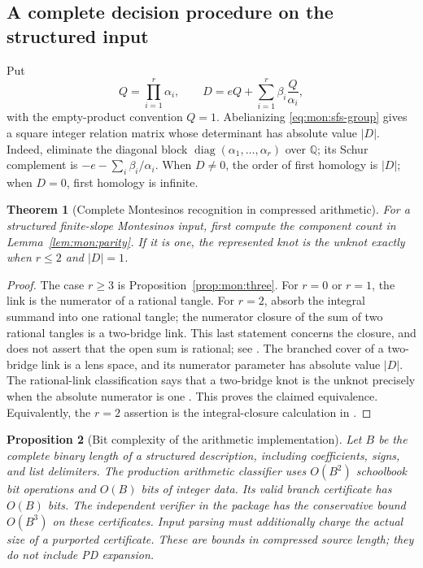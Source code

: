 \documentclass[11pt,a4paper]{article}
\newtheorem{theorem}{Theorem}[section]
\newtheorem{proposition}[theorem]{Proposition}
\theoremstyle{definition}
\theoremstyle{remark}
\numberwithin{equation}{section}
\begin{document}
\subsection{A complete decision procedure on the structured input}

Put
\begin{equation}\label{eq:mon:delta}
 Q=\prod_{i=1}^r\alpha_i,\qquad
 D=eQ+\sum_{i=1}^r\beta_i\frac{Q}{\alpha_i},
\end{equation}
with the empty-product convention $Q=1$.  Abelianizing
\eqref{eq:mon:sfs-group} gives a square integer relation matrix whose
determinant has absolute value $|D|$.  Indeed, eliminate the diagonal block
$\operatorname{diag}(\alpha_1,\ldots,\alpha_r)$ over $\mathbb Q$; its Schur
complement is $-e-\sum_i\beta_i/\alpha_i$.  When $D\ne0$, the order of first
homology is $|D|$; when $D=0$, first homology is infinite.

\begin{theorem}[Complete Montesinos recognition in compressed arithmetic]
\label{thm:mon:complete}
For a structured finite-slope Montesinos input, first compute the component
count in Lemma~\ref{lem:mon:parity}.  If it is one, the represented knot is
the unknot exactly when $r\le2$ and $|D|=1$.
\end{theorem}

\begin{proof}
The case $r\ge3$ is Proposition~\ref{prop:mon:three}.
For $r=0$ or $r=1$, the link is the numerator of a rational tangle.
For $r=2$, absorb the integral summand into one rational tangle; the numerator
closure of the sum of two rational tangles is a two-bridge link.  This last
statement concerns the closure, and does not assert that the open sum is
rational; see \cite[Section~2]{kauffman-lambropoulou-tangles}.
The branched cover of a two-bridge link is a lens space, and its numerator
parameter has absolute value $|D|$.  The rational-link classification says
that a two-bridge knot is the unknot precisely when the absolute numerator
is one \cite{kauffman-lambropoulou-knots}.  This proves the claimed equivalence.
Equivalently, the $r=2$ assertion is the integral-closure calculation in
\cite[Theorem~4.9]{nogueira-salgueiro}.
\end{proof}

\begin{proposition}[Bit complexity of the arithmetic implementation]
\label{prop:mon:complexity}
Let $B$ be the complete binary length of a structured description, including
coefficients, signs, and list delimiters. The production arithmetic classifier
uses $O(B^2)$ schoolbook bit operations and $O(B)$ bits of integer data.
Its valid branch certificate has $O(B)$ bits. The independent verifier in the
package has the conservative bound $O(B^3)$ on these certificates. Input
parsing must additionally charge the actual size of a purported certificate.
These are bounds in compressed source length; they do not include PD expansion.
\end{proposition}
\end{document}
